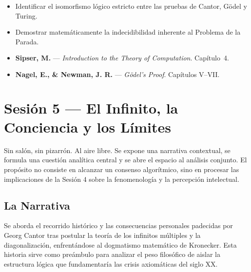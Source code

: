 \documentclass[11pt, letterpaper]{article}
\begin{document}
\begin{objetivos}
\begin{itemize}
  \item Identificar el isomorfismo l\'ogico estricto entre las pruebas de Cantor, G\"odel y Turing.
  \item Demostrar matem\'aticamente la indecidibilidad inherente al Problema de la Parada.
\end{itemize}
\end{objetivos}

\begin{lecturas}
\begin{itemize}
  \item[$(\star)$] \textbf{Sipser, M.} --- \emph{Introduction to the Theory of Computation}. Cap\'itulo~4.
  \item[$(\star)$] \textbf{Nagel, E., \& Newman, J. R.} --- \emph{G\"odel's Proof}. Cap\'itulos V--VII.
\end{itemize}
\end{lecturas}

\newpage

\section{Sesi\'on 5 --- El Infinito, la Conciencia y los L\'imites}

\begin{peripatetic}
Sin sal\'on, sin pizarr\'on. Al aire libre. Se expone una narrativa contextual, se formula una cuesti\'on anal\'itica central y se abre el espacio al an\'alisis conjunto. El prop\'osito no consiste en alcanzar un consenso algor\'itmico, sino en procesar las implicaciones de la Sesi\'on 4 sobre la fenomenolog\'ia y la percepci\'on intelectual.
\end{peripatetic}

\vspace{0.5em}

\subsection*{La Narrativa}
Se aborda el recorrido hist\'orico y las consecuencias personales padecidas por Georg Cantor tras postular la teor\'ia de los infinitos m\'ultiples y la diagonalizaci\'on, enfrent\'andose al dogmatismo matem\'atico de Kronecker. Esta historia sirve como pre\'ambulo para analizar el peso filos\'ofico de aislar la estructura l\'ogica que fundamentar\'ia las crisis axiom\'aticas del siglo XX.
\end{document}
